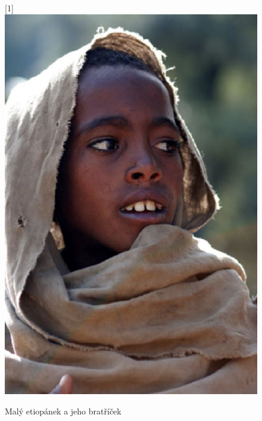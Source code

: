 \documentclass[a4paper, 11pt]{article}
\begin{document}
\begin{figure}[h]
\begin{center}
    \scalebox{-1}[1]{\includegraphics[scale=0.39]{etiopan.eps}}
    \caption{Malý etiopánek a jeho bratříček}
    \label{figure:obrazek}
    \end{center}
\end{figure}

\pagebreak
\end{document}
